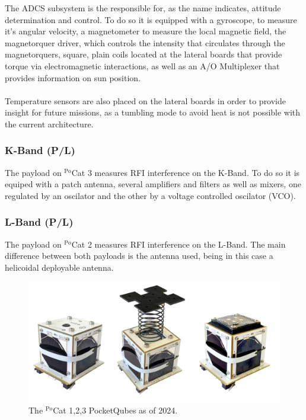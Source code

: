  The ADCS subsystem is the responsible for, as the name indicates, 
 attitude determination and control. To do so it is equipped with a 
 gyroscope, to measure it's angular velocity, a magnetometer to measure 
 the local magnetic field, the magnetorquer driver, which controls the 
 intensity that circulates through the magnetorquers, square, plain coils 
 located at the lateral boards that provide torque via electromagnetic 
 interactions, as well as an A/O Multiplexer that provides information 
 on sun position.
\paragraph{}
Temperature sensors are also placed on the lateral boards in order to 
provide insight for future missions, as a tumbling mode to avoid heat 
is not possible with the current architecture.

\subsubsection{K-Band (P/L)}
The payload on $^{\text{Po}}$Cat 3 measures RFI interference on the K-Band.
To do so it is equiped with a patch antenna, several amplifiers 
and filters as well as mixers, one regulated by an oscilator and
the other by a voltage controlled oscilator (VCO).

\subsubsection{L-Band (P/L)}
The payload on $^{\text{Po}}$Cat 2 measures RFI interference on the L-Band.
The main difference between both payloads is the antenna used, being in this case
a helicoidal deployable antenna.

\begin{figure}[H]
    \centering
    \includegraphics[width=0.8\linewidth]{res/img/1_introduction/pocat123.png}
    \caption{The $^{\text{Po}}$Cat 1,2,3 PocketQubes as of 2024.}
    \label{fig:pocat123}
\end{figure}


